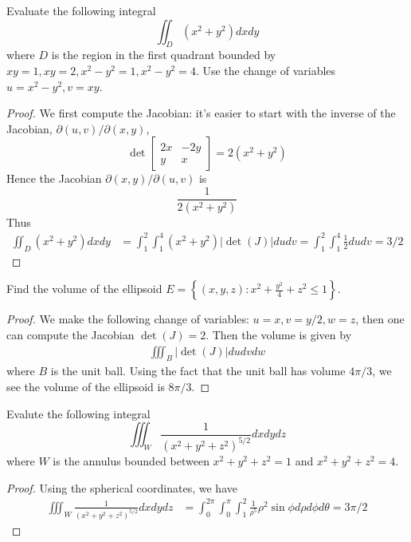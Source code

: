 \documentclass[openany]{book}
\begin{document}
\begin{prob}
    Evaluate the following integral 
    \begin{equation*}
        \iint_D(x^2+y^2)dxdy
    \end{equation*}
    where $D$ is the region in the first quadrant bounded by $xy=1, xy=2, x^2-y^2=1, x^2-y^2=4$. Use the change of variables $u=x^2-y^2, v=xy$.
\end{prob}
\begin{proof}
    We first compute the Jacobian: it's easier to start with the inverse of the Jacobian, $\partial(u,v)/\partial(x,y)$, 
    \begin{equation*}
        \det\begin{bmatrix}
            2x&-2y\\
            y&x
        \end{bmatrix}=2(x^2+y^2)
    \end{equation*}
    Hence the Jacobian $\partial(x,y)/\partial(u,v)$ is 
    \begin{equation*}
        \frac{1}{2(x^2+y^2)}
    \end{equation*}
    Thus 
    \begin{align*}
        \iint_D(x^2+y^2)dxdy&=\int_1^2\int_1^4(x^2+y^2)|\det(J)|dudv=\int_1^2\int_1^4\frac{1}{2}dudv=3/2
    \end{align*}
\end{proof}



\begin{prob}
    Find the volume of the ellipsoid $E=\left\{(x,y,z): x^2+\frac{y^2}{4}+z^2\leq 1\right\}$.
\end{prob}
\begin{proof}
    We make the following change of variables: $u=x, v=y/2, w=z$, then one can compute the Jacobian $\det(J)=2$. Then the volume is given by 
    \begin{align*}
        \iiint_B |\det(J)|dudvdw
    \end{align*}
    where $B$ is the unit ball. Using the fact that the unit ball has volume $4\pi/3$, we see the volume of the ellipsoid is $8\pi/3$.
\end{proof}



\begin{prob}
    Evalute the following integral 
    \begin{equation*}
        \iiint_W\frac{1}{(x^2+y^2+z^2)^{5/2}}dxdydz
    \end{equation*}
    where $W$ is the annulus bounded between $x^2+y^2+z^2=1$ and $x^2+y^2+z^2=4$.
\end{prob}
\begin{proof}
    Using the spherical coordinates, we have 
    \begin{align*}
        \iiint_W\frac{1}{(x^2+y^2+z^2)^{5/2}}dxdydz&=\int_0^{2\pi}\int_0^\pi\int_1^2\frac{1}{\rho^5}\rho^2\sin\phi d\rho d\phi d\theta=3\pi/2
    \end{align*}
\end{proof}
\end{document}
